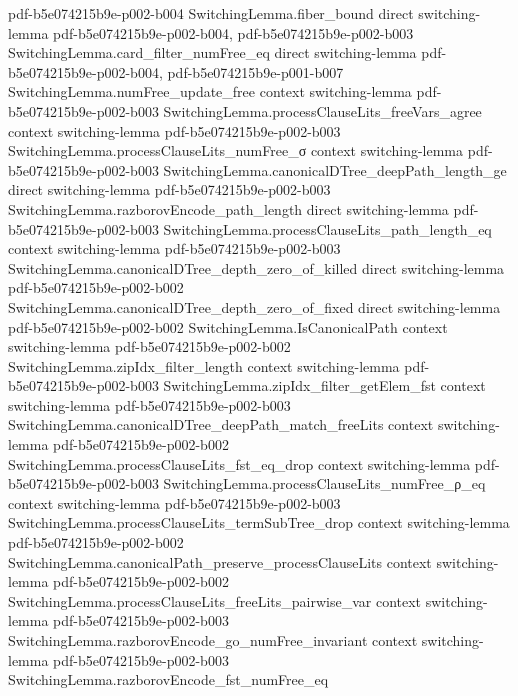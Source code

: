 \begin{theorem}
{    pdf-b5e074215b9e-p002-b004}
\proofstep
  {SwitchingLemma.fiber_bound}
  {direct}
  {switching-lemma}
  {pdf-b5e074215b9e-p002-b004,
    pdf-b5e074215b9e-p002-b003}
\proofstep
  {SwitchingLemma.card_filter_numFree_eq}
  {direct}
  {switching-lemma}
  {pdf-b5e074215b9e-p002-b004,
    pdf-b5e074215b9e-p001-b007}
\proofstep
  {SwitchingLemma.numFree_update_free}
  {context}
  {switching-lemma}
  {pdf-b5e074215b9e-p002-b003}
\proofstep
  {SwitchingLemma.processClauseLits_freeVars_agree}
  {context}
  {switching-lemma}
  {pdf-b5e074215b9e-p002-b003}
\proofstep
  {SwitchingLemma.processClauseLits_numFree_σ}
  {context}
  {switching-lemma}
  {pdf-b5e074215b9e-p002-b003}
\proofstep
  {SwitchingLemma.canonicalDTree_deepPath_length_ge}
  {direct}
  {switching-lemma}
  {pdf-b5e074215b9e-p002-b003}
\proofstep
  {SwitchingLemma.razborovEncode_path_length}
  {direct}
  {switching-lemma}
  {pdf-b5e074215b9e-p002-b003}
\proofstep
  {SwitchingLemma.processClauseLits_path_length_eq}
  {context}
  {switching-lemma}
  {pdf-b5e074215b9e-p002-b003}
\proofstep
  {SwitchingLemma.canonicalDTree_depth_zero_of_killed}
  {direct}
  {switching-lemma}
  {pdf-b5e074215b9e-p002-b002}
\proofstep
  {SwitchingLemma.canonicalDTree_depth_zero_of_fixed}
  {direct}
  {switching-lemma}
  {pdf-b5e074215b9e-p002-b002}
\proofstep
  {SwitchingLemma.IsCanonicalPath}
  {context}
  {switching-lemma}
  {pdf-b5e074215b9e-p002-b002}
\proofstep
  {SwitchingLemma.zipIdx_filter_length}
  {context}
  {switching-lemma}
  {pdf-b5e074215b9e-p002-b003}
\proofstep
  {SwitchingLemma.zipIdx_filter_getElem_fst}
  {context}
  {switching-lemma}
  {pdf-b5e074215b9e-p002-b003}
\proofstep
  {SwitchingLemma.canonicalDTree_deepPath_match_freeLits}
  {context}
  {switching-lemma}
  {pdf-b5e074215b9e-p002-b002}
\proofstep
  {SwitchingLemma.processClauseLits_fst_eq_drop}
  {context}
  {switching-lemma}
  {pdf-b5e074215b9e-p002-b003}
\proofstep
  {SwitchingLemma.processClauseLits_numFree_ρ_eq}
  {context}
  {switching-lemma}
  {pdf-b5e074215b9e-p002-b003}
\proofstep
  {SwitchingLemma.processClauseLits_termSubTree_drop}
  {context}
  {switching-lemma}
  {pdf-b5e074215b9e-p002-b002}
\proofstep
  {SwitchingLemma.canonicalPath_preserve_processClauseLits}
  {context}
  {switching-lemma}
  {pdf-b5e074215b9e-p002-b002}
\proofstep
  {SwitchingLemma.processClauseLits_freeLits_pairwise_var}
  {context}
  {switching-lemma}
  {pdf-b5e074215b9e-p002-b003}
\proofstep
  {SwitchingLemma.razborovEncode_go_numFree_invariant}
  {context}
  {switching-lemma}
  {pdf-b5e074215b9e-p002-b003}
\proofstep
  {SwitchingLemma.razborovEncode_fst_numFree_eq}

\end{theorem}
